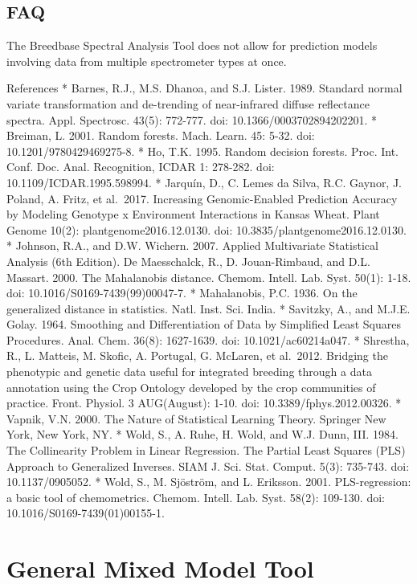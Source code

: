 \documentclass[
  12pt,
]{book}
\begin{document}
\hypertarget{faq}{%
\subsection{FAQ}\label{faq}}

The Breedbase Spectral Analysis Tool does not allow for prediction models involving data from multiple spectrometer types at once.

References * Barnes, R.J., M.S. Dhanoa, and S.J. Lister. 1989. Standard normal variate transformation and de-trending of near-infrared diffuse reflectance spectra. Appl. Spectrosc. 43(5): 772-777. doi: 10.1366/0003702894202201. * Breiman, L. 2001. Random forests. Mach. Learn. 45: 5-32. doi: 10.1201/9780429469275-8. * Ho, T.K. 1995. Random decision forests. Proc. Int. Conf. Doc. Anal. Recognition, ICDAR 1: 278-282. doi: 10.1109/ICDAR.1995.598994. * Jarquín, D., C. Lemes da Silva, R.C. Gaynor, J. Poland, A. Fritz, et al.~2017. Increasing Genomic-Enabled Prediction Accuracy by Modeling Genotype x Environment Interactions in Kansas Wheat. Plant Genome 10(2): plantgenome2016.12.0130. doi: 10.3835/plantgenome2016.12.0130. * Johnson, R.A., and D.W. Wichern. 2007. Applied Multivariate Statistical Analysis (6th Edition). De Maesschalck, R., D. Jouan-Rimbaud, and D.L. Massart. 2000. The Mahalanobis distance. Chemom. Intell. Lab. Syst. 50(1): 1-18. doi: 10.1016/S0169-7439(99)00047-7. * Mahalanobis, P.C. 1936. On the generalized distance in statistics. Natl. Inst. Sci. India. * Savitzky, A., and M.J.E. Golay. 1964. Smoothing and Differentiation of Data by Simplified Least Squares Procedures. Anal. Chem. 36(8): 1627-1639. doi: 10.1021/ac60214a047. * Shrestha, R., L. Matteis, M. Skofic, A. Portugal, G. McLaren, et al.~2012. Bridging the phenotypic and genetic data useful for integrated breeding through a data annotation using the Crop Ontology developed by the crop communities of practice. Front. Physiol. 3 AUG(August): 1-10. doi: 10.3389/fphys.2012.00326. * Vapnik, V.N. 2000. The Nature of Statistical Learning Theory. Springer New York, New York, NY. * Wold, S., A. Ruhe, H. Wold, and W.J. Dunn, III. 1984. The Collinearity Problem in Linear Regression. The Partial Least Squares (PLS) Approach to Generalized Inverses. SIAM J. Sci. Stat. Comput. 5(3): 735-743. doi: 10.1137/0905052. * Wold, S., M. Sjöström, and L. Eriksson. 2001. PLS-regression: a basic tool of chemometrics. Chemom. Intell. Lab. Syst. 58(2): 109-130. doi: 10.1016/S0169-7439(01)00155-1.

\hypertarget{general-mixed-model-tool}{%
\section{General Mixed Model Tool}\label{general-mixed-model-tool}}
\end{document}
